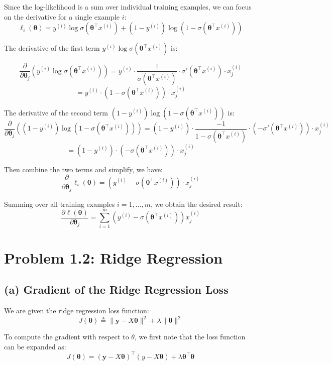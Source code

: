 \documentclass[12pt]{article}
\begin{document}
Since the log-likelihood is a sum over individual training examples, we can focus on the derivative for a single example \(i\):
\[
    \ell_i(\boldsymbol\theta) = y^{(i)} \log \sigma(\boldsymbol\theta^\top x^{(i)}) + (1 - y^{(i)}) \log(1 - \sigma(\boldsymbol\theta^\top x^{(i)}))
\]

The derivative of the first term \(y^{(i)} \log \sigma(\boldsymbol\theta^\top x^{(i)})\) is:


\[
    \frac{\partial}{\partial \boldsymbol\theta_j} \left( y^{(i)} \log \sigma(\boldsymbol\theta^\top x^{(i)}) \right)
    = y^{(i)} \cdot \frac{1}{\sigma(\boldsymbol\theta^\top x^{(i)})} \cdot \sigma'(\boldsymbol\theta^\top x^{(i)}) \cdot x_j^{(i)}
\]
\[
    = y^{(i)} \cdot (1 - \sigma(\boldsymbol\theta^\top x^{(i)})) \cdot x_j^{(i)}
\]

The derivative of the second term \((1 - y^{(i)}) \log(1 - \sigma(\boldsymbol\theta^\top x^{(i)}))\) is:
\[
\frac{\partial}{\partial \boldsymbol\theta_j} \left( (1 - y^{(i)}) \log(1 - \sigma(\boldsymbol\theta^\top x^{(i)})) \right)
= (1 - y^{(i)}) \cdot \frac{-1}{1 - \sigma(\boldsymbol\theta^\top x^{(i)})} \cdot (-\sigma'(\boldsymbol\theta^\top x^{(i)})) \cdot x_j^{(i)}
\]
\[
    = (1 - y^{(i)}) \cdot (- \sigma(\boldsymbol\theta^\top x^{(i)})) \cdot x_j^{(i)}
\]

Then combine the two terms and simplify, we have:
\[
    \frac{\partial}{\partial \boldsymbol\theta_j}\ell_i(\boldsymbol\theta) = (y^{(i)} - \sigma(\boldsymbol\theta^\top x^{(i)})) \cdot x_j^{(i)}
\]

Summing over all training examples \(i = 1, \ldots, m\), we obtain the desired result:
\[
\frac{\partial \ell(\boldsymbol\theta)}{\partial \boldsymbol\theta_j} = \sum_{i=1}^{m} \left( y^{(i)} - \sigma(\boldsymbol\theta^\top x^{(i)}) \right) x_j^{(i)}
\]

\section*{Problem 1.2: Ridge Regression}

\subsection*{(a) Gradient of the Ridge Regression Loss}

We are given the ridge regression loss function:
\[
J(\boldsymbol\theta) \triangleq \| \boldsymbol y - X \boldsymbol\theta \|^2 + \lambda \|\boldsymbol\theta\|^2
\]

To compute the gradient with respect to \( \theta \), we first note that the loss function can be expanded as:
\[
J(\boldsymbol\theta) = (\boldsymbol y - X\boldsymbol\theta)^\top (y - X\boldsymbol\theta) + \lambda \boldsymbol\theta^\top \boldsymbol\theta
\]
\end{document}
